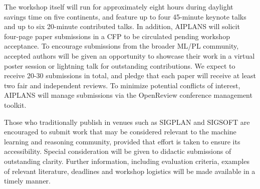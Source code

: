 \documentclass{article}
\begin{document}



    The workshop itself will run for approximately eight hours during daylight savings time on five continents, and feature up to four 45-minute keynote talks and up to six 20-minute contributed talks. In addition, AIPLANS will solicit four-page paper submissions in a CFP to be circulated pending workshop acceptance. To encourage submissions from the broader ML/PL community, accepted authors will be given an opportunity to showcase their work in a virtual poster session or lightning talk for outstanding contributions. We expect to receive 20-30 submissions in total, and pledge that each paper will receive at least two fair and independent reviews. To minimize potential conflicts of interest, AIPLANS will manage submissions via the OpenReview conference management toolkit.





    Those who traditionally publish in venues such as SIGPLAN and SIGSOFT are encouraged to submit work that may be considered relevant to the machine learning and reasoning community, provided that effort is taken to ensure its accessibility. Special consideration will be given to didactic submissions of outstanding clarity. Further information, including evaluation criteria, examples of relevant literature, deadlines and workshop logistics will be made available in a timely manner.

\end{document}
